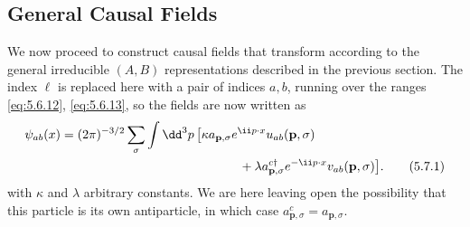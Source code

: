 
\subsection[General Causal Fields]{General Causal Fields\protect\footnotemark}

We now proceed to construct causal fields that transform according to the
general irreducible $(A,B)$ representations described in the previous section.
The index $\ell$ is replaced here with a pair of indices $a,b$, running over
the ranges \eqref{eq:5.6.12}, \eqref{eq:5.6.13}, so the fields are now written as
\begin{align}
\psi_{ab}(x)={}&(2\pi)^{-3/2}\sum_\sigma\int \dd^3p\,
\bigl[\kappa a_{\mathbf p,\sigma}e^{\ii p\cdot x}u_{ab}(\mathbf p,\sigma)
\notag\\
&\hspace{45mm}+\lambda a^{c\dagger}_{\mathbf p,\sigma}e^{-\ii p\cdot x}
v_{ab}(\mathbf p,\sigma)\bigr].
\tag{5.7.1}\label{eq:5.7.1}
\end{align}
with $\kappa$ and $\lambda$ arbitrary constants. We are here leaving open the
possibility that this particle is its own antiparticle, in which case
$a^c_{\mathbf p,\sigma}=a_{\mathbf p,\sigma}$.

